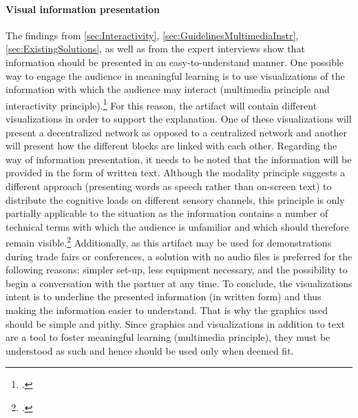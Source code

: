 
\paragraph{Visual information presentation} The findings from \ref{sec:Interactivity}, \ref{sec:GuidelinesMultimediaInstr}, \ref{sec:ExistingSolutions}, as well as from the expert interviews show that information should be presented in an easy-to-understand manner. One possible way to engage the audience in meaningful learning is to use visualizations of the information with which the audience may interact (multimedia principle and interactivity principle).\footcites[Cf.][]{RalphBeckmann_Interview}[cf.][p.1025]{DomagkInteractivitymultimedialearning2010}[cf.][p.311]{MorenoInteractiveMultimodalLearning2007}[cf.][p.290]{Betrancourtanimationinteractivityprinciples2005} For this reason, the artifact will contain different visualizations in order to support the explanation. One of these visualizations will present a decentralized network as opposed to a centralized network and another will present how the different blocks are linked with each other. Regarding the way of information presentation, it needs to be noted that the information will be provided in the form of written text. Although the modality principle suggests a different approach (presenting words as speech rather than on-screen text) to distribute the cognitive loads on different sensory channels, this principle is only partially applicable to the situation as the information contains a number of technical terms with which the audience is unfamiliar and which should therefore remain visible.\footcite[Cf.][chapter 6, paragraph 1]{ClarkElearningscienceinstruction2016} Additionally, as this artifact may be used for demonstrations during trade fairs or conferences, a solution with no audio files is preferred for the following reasons: simpler set-up, less equipment necessary, and the possibility to begin a conversation with the partner at any time. To conclude, the visualizations intent is to underline the presented information (in written form) and thus making the information easier to understand. That is why the graphics used should be simple and pithy. Since graphics and visualizations in addition to text are a tool to foster meaningful learning (multimedia principle), they must be understood as such and hence should be used only when deemed fit. 

